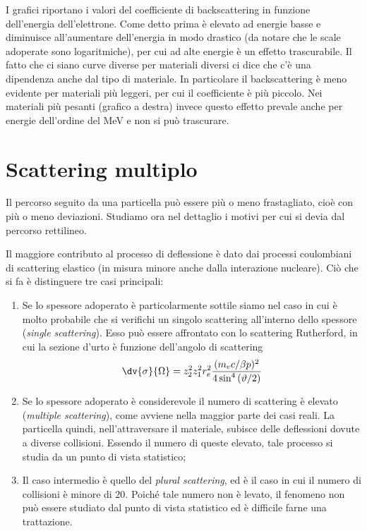 I grafici riportano i valori del coefficiente di backscattering in funzione dell'energia dell'elettrone. Come detto prima è elevato ad energie basse e diminuisce all'aumentare dell'energia in modo drastico (da notare che le scale adoperate sono logaritmiche), per cui ad alte energie è un effetto trascurabile. Il fatto che ci siano curve diverse per materiali diversi ci dice che c'è una dipendenza anche dal tipo di materiale. In particolare il backscattering è meno evidente per materiali più leggeri, per cui il coefficiente è più piccolo. Nei materiali più pesanti (grafico a destra) invece questo effetto prevale anche per energie dell'ordine del MeV e non si può trascurare.

\section{Scattering multiplo}

Il percorso seguito da una particella può essere più o meno frastagliato, cioè con più o meno deviazioni. Studiamo ora nel dettaglio i motivi per cui si devia dal percorso rettilineo.

Il maggiore contributo al processo di deflessione è dato dai processi coulombiani di scattering elastico (in misura minore anche dalla interazione nucleare). Ciò che si fa è distinguere tre casi principali:

\begin{enumerate}
    \item Se lo spessore adoperato è particolarmente sottile siamo nel caso in cui è molto probabile che si verifichi un singolo scattering all'interno dello spessore (\textit{single scattering}). Esso può essere affrontato con lo scattering Rutherford, in cui la sezione d'urto è funzione dell'angolo di scattering
    \begin{equation*}
        \dv{\sigma}{\Omega}=z_2^2 z_1^2 r_e^2 \frac{(m_ec/\beta p)^2}{4 \sin^4{(\vartheta/2)}}
    \end{equation*}
    \item Se lo spessore adoperato è considerevole il numero di scattering è elevato (\textit{multiple scattering}), come avviene nella maggior parte dei casi reali. La particella quindi, nell'attraversare il materiale, subisce delle deflessioni dovute a diverse collisioni. Essendo il numero di queste elevato, tale processo si studia da un punto di vista statistico;
    \item Il caso intermedio è quello del \textit{plural scattering}, ed è il caso in cui il numero di collisioni è minore di 20. Poiché tale numero non è levato, il fenomeno non può essere studiato dal punto di vista statistico ed è difficile farne una trattazione.
\end{enumerate}

